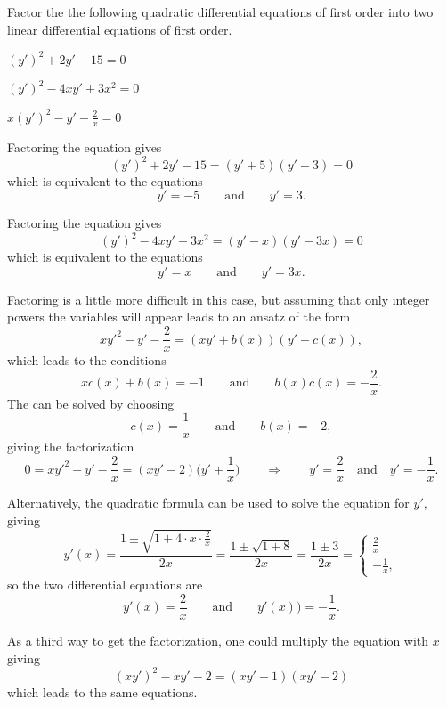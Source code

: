 Factor the the following quadratic differential equations of first
order into two linear differential equations of first order.
\begin{teilaufgaben}
\item
$(y')^2 + 2y' - 15
=0$
\item
$(y')^2 - 4xy' + 3x^2
=0$
\item
$x(y')^2 - y' - \frac2x
=0$
\end{teilaufgaben}


\begin{loesung}
\begin{teilaufgaben}
\item 
Factoring the equation gives
\[
(y')^2 + 2y' - 15 = (y'+5)(y'-3)=0
\]
which is equivalent to the equations
\[
y'=-5
\qquad\text{and}\qquad
y'=3.
\]
\item
Factoring the equation gives
\[
(y')^2 - 4xy' + 3x^2
=
(y' - x)(y' - 3x)
=
0
\]
which is equivalent to the equations
\[
y' = x
\qquad\text{and}\qquad
y' = 3x.
\]
\item
Factoring is a little more difficult in this case, but assuming that
only integer powers the variables will appear leads to an ansatz of the
form
\[
xy'^2 - y' - \frac2x
=
(xy' + b(x))(y' + c(x)),
\]
which leads to the conditions
\[
xc(x) + b(x) = -1
\qquad\text{and}\qquad
b(x)c(x) = -\frac2x.
\]
The can be solved by choosing
\[
c(x) = \frac1x
\qquad\text{and}\qquad
b(x) = -2,
\]
giving the factorization
\[
0
=
xy'^2 - y' - \frac2x
=
(xy'-2)\biggl(y' + \frac1x\biggr)
\qquad\Rightarrow\qquad
y'=\frac2x\quad\text{and}\quad y'=-\frac1x.
\]

Alternatively, the quadratic formula can be used to solve the equation
for $y'$, giving
\[
y'(x)
=
\frac{1\pm\sqrt{1+4\cdot x\cdot \frac2x}}{2x}
=
\frac{1\pm\sqrt{1+8}}{2x}
=
\frac{1\pm3}{2x}
=
\begin{cases}
\frac2x\\
-\frac1x,
\end{cases}
\]
so the two differential equations are
\[
y'(x) = \frac2x
\qquad\text{and}\qquad
y'(x))= -\frac1x.
\]

As a third way to get the factorization, one could multiply the
equation with $x$ giving
\[
(xy')^2 -xy' - 2
=
(xy'+1)(xy'-2)
\]
which leads to the same equations.
\qedhere
\end{teilaufgaben}
\end{loesung}


